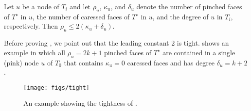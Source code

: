 \documentclass[a4paper,UKenglish]{socg-lipics-v2019}
\newcommand{\dual}[1]{{#1}^\star}
\begin{document}
\begin{lem}
   Let $u$ be a node of $T_i$ and let $\rho_u$, $\kappa_u$, and $\delta_u$ denote the number of pinched faces of $\dual{T}$ in $u$, the number of caressed faces of $\dual{T}$ in $u$, and the degree of $u$ in $T_i$, respectively.  Then $\rho_u \le 2(\kappa_u+\delta_u)$.
\end{lem}

Before proving , we point out that
the leading constant 2 is tight.  shows an example in
which all $\rho_u=2k+1$ pinched faces of $\dual{T}$ are contained in a
single (pink) node $u$ of $T_0$ that contains $\kappa_u=0$ caressed faces and
has degree $\delta_u=k+2$.

\begin{figure}
  \begin{center}
    \texttt{[image: figs/tight]}
  \end{center}
  \caption{An example showing the tightness of .}
\end{figure}
\end{document}
